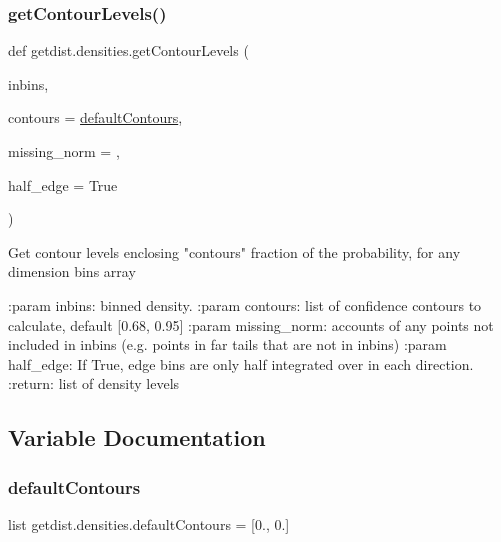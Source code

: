 \subsubsection{\texorpdfstring{get\+Contour\+Levels()}{getContourLevels()}}
{\footnotesize\ttfamily def getdist.\+densities.\+get\+Contour\+Levels (\begin{DoxyParamCaption}\item[{}]{inbins,  }\item[{}]{contours = {\ttfamily \mbox{\hyperlink{namespacegetdist_1_1densities_a93d19accaa564f6252d80ae48a40ae3b}{default\+Contours}}},  }\item[{}]{missing\+\_\+norm = {},  }\item[{}]{half\+\_\+edge = {\ttfamily True} }\end{DoxyParamCaption})}

\begin{DoxyVerb} Get contour levels enclosing "contours" fraction of the probability, for any dimension bins array
 
 :param inbins: binned density. 
 :param contours: list of confidence contours to calculate, default [0.68, 0.95]
 :param missing_norm: accounts of any points not included in inbins (e.g. points in far tails that are not in inbins) 
 :param half_edge: If True, edge bins are only half integrated over in each direction.
 :return: list of density levels\end{DoxyVerb}
 

\subsection{Variable Documentation}
\mbox{\label{namespacegetdist_1_1densities_a93d19accaa564f6252d80ae48a40ae3b}} 
\subsubsection{\texorpdfstring{default\+Contours}{defaultContours}}
{\footnotesize\ttfamily list getdist.\+densities.\+default\+Contours = \mbox{[}0., 0.\mbox{]}}

